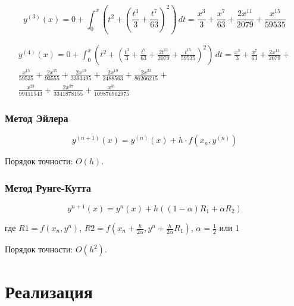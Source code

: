 \begin{equation}
    \label{f3}
    y^{(3)}(x) = 0 + \int_{0}^{x} (t^2 + \left(\frac{t^3}{3} + \frac{t^7}{63}\right)^2) \,dt = \frac{x^3}{3} + \frac{x^7}{63} + \frac{2x^{11}}{2079} + \frac{x^{15}}{59535}
\end{equation}

\begin{equation}
    \begin{split}
        \label{f4}
        y^{(4)}(x) = 0 + \int_{0}^{x} (t^2 + \left(\frac{t^3}{3} + \frac{t^7}{63} + \frac{2t^{11}}{2079} + \frac{t^{15}}{59535}\right)^2) \,dt = \frac{x^3}{3} + \frac{x^7}{63} + \frac{2x^{11}}{2079} +\\
        \frac{x^{15}}{59535} + \frac{2x^{15}}{93555} + \frac{2x^{19}}{3393495} + \frac{2x^{19}}{2488563} + \frac{2x^{23}}{86266215} + \\
        \frac{x^{23}}{99411543} + \frac{2x^{27}}{3341878155}  + \frac{x^{31}}{109876902975}
    \end{split}
\end{equation}

\subsection{Метод Эйлера}

\begin{equation}
    \label{ey}
    y^{(n+1)}(x) = y^{(n)}(x) + h \cdot f(x_{n}, y^{(n)})
\end{equation}

\indent Порядок точности: $O(h)$.

\subsection{Метод Рунге-Кутта}

\begin{equation}
    \label{rk}
    y^{n+1}(x) = y^{n}(x) + h ((1-\alpha) R_1 + \alpha R_2)
\end{equation}\newline

где $R1 = f(x_{n}, y^{n})$, $R2 = f(x_{n} + \frac{h}{2\alpha}, y^{n} + \frac{h}{2\alpha}R_1)$, $\alpha = \frac{1}{2}$ или 1\newline

Порядок точности: $O(h^2)$.

\clearpage

\chapter{Реализация}

